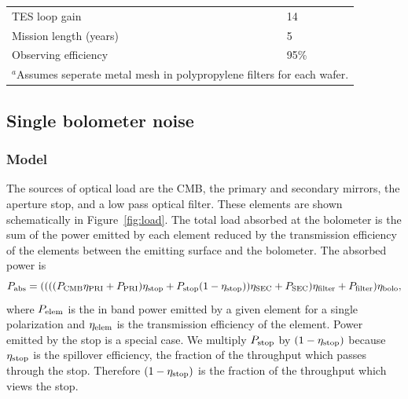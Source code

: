 \documentclass[]{spie}  %
\newcommand{\comr}[1]{\textcolor{red}{#1}}
\begin{document}
\begin{table}[ht]
\begin{tabular}{|l|l|}
TES loop gain                    & 14                                \\
Mission length (years)           & 5                                                \\
Observing efficiency             & 95\%                                             \\
\hline
\multicolumn{2}{l}{\footnotesize $^a$Assumes seperate metal mesh in polypropylene filters for each wafer.}
\end{tabular}
\end{table}


\subsection{Single bolometer noise}
\label{sec:det_noise}

\subsubsection{Model}

The sources of optical load are the CMB, the primary and secondary mirrors, the aperture stop, and a low pass optical filter.  
These elements are shown schematically in Figure~\ref{fig:load}. 
The total load absorbed at the bolometer is the sum of the power emitted by each element reduced by the transmission 
efficiency of the elements between the emitting surface and the bolometer.  
The absorbed power is
\begin{equation}
\label{eq:load}
P_{\rm abs} =  (((( P_{\rm CMB} \eta_{\rm PRI} + P_{\rm PRI} ) \eta_{\rm stop} + P_{\rm stop}(1-\eta_{\rm stop}) ) \eta_{\rm SEC} + P_{\rm SEC})\eta_{\rm filter} + P_{\rm filter}) \eta_{\rm bolo},
\end{equation} 
where $P_{\rm elem}$ is the in band power emitted by a given element for a single polarization and $\eta_{\rm elem}$ is the 
transmission efficiency 
of the element. Power emitted by the stop is a special case. We multiply $P_{\rm stop}$ by 
$(1-\eta_{\rm stop})$ because $\eta_{\rm stop}$ is the spillover efficiency, the fraction of the throughput which passes through the 
stop. Therefore $(1-\eta_{\rm stop})$ is the fraction of the throughput which views the stop. 
\end{document}
